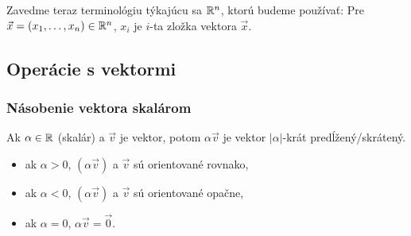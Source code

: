 Zavedme teraz terminológiu týkajúcu sa $\mathbb{R}^n$, ktorú budeme používať:
Pre $\vec{x}=(x_1, \dots, x_n) \in \mathbb{R}^n$, $x_i$ je $i$-ta zložka vektora $\vec{x}$.



\subsection{Operácie s vektormi}

\subsubsection{Násobenie vektora skalárom}
\begin{definition}
Ak $\alpha \in \mathbb{R}$ (skalár) a $\vec{v}$ je vektor, potom $\alpha\vec{v}$ je vektor $|\alpha|$-krát predĺžený/skrátený.
\begin{itemize}
    \item ak $\alpha > 0$, $(\alpha\vec{v})$ a $\vec{v}$ sú orientované rovnako,
    \item ak $\alpha < 0$, $(\alpha\vec{v})$ a $\vec{v}$ sú orientované opačne,
    \item ak $\alpha=0$, $\alpha\vec{v} = \vec{0}$.
\end{itemize}
\end{definition}

\begin{example}
~\\
\begin{center}
\end{center}
\end{example}

